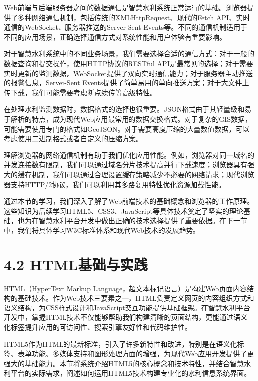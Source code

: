 Web前端与后端服务器之间的数据通信是智慧水利系统正常运行的基础。浏览器提供了多种网络通信机制，包括传统的XMLHttpRequest、现代的Fetch API、实时通信的WebSocket、服务器推送的Server-Sent Events等。不同的通信机制适用于不同的应用场景，正确选择通信方式对系统性能和用户体验有重要影响。

对于智慧水利系统中的不同业务场景，我们需要选择合适的通信方式：对于一般的数据查询和提交操作，使用HTTP协议的RESTful API是最常见的选择；对于需要实时更新的监测数据，WebSocket提供了双向实时通信能力；对于服务器主动推送的报警信息，Server-Sent Events提供了简单易用的单向推送方案；对于大文件上传下载，我们可能需要考虑断点续传等高级特性。

在处理水利监测数据时，数据格式的选择也很重要。JSON格式由于其轻量级和易于解析的特点，成为现代Web应用最常用的数据交换格式。对于复杂的GIS数据，可能需要使用专门的格式如GeoJSON。对于需要高度压缩的大量数值数据，可以考虑使用二进制格式或者自定义的压缩方案。

理解浏览器的网络通信机制有助于我们优化应用性能。例如，浏览器对同一域名的并发连接数有限制，我们可以通过域名分片技术提高并行下载速度；浏览器具有强大的缓存机制，我们可以通过合理设置缓存策略减少不必要的网络请求；现代浏览器支持HTTP/2协议，我们可以利用其多路复用特性优化资源加载性能。

通过本节的学习，我们深入了解了Web前端技术的基础概念和浏览器的工作原理。这些知识为后续学习HTML5、CSS3、JavaScript等具体技术奠定了坚实的理论基础，也为在智慧水利平台开发中做出正确的技术选择提供了重要依据。在下一节中，我们将具体学习W3C标准体系和现代Web技术的发展趋势。

\hypertarget{htmlux57faux7840ux4e0eux5b9eux8df5}{%
\section{4.2 HTML基础与实践}\label{htmlux57faux7840ux4e0eux5b9eux8df5}}

HTML（HyperText Markup Language，超文本标记语言）是构建Web页面内容结构的基础技术。作为Web技术三要素之一，HTML负责定义网页的内容组织方式和语义结构，为CSS样式设计和JavaScript交互功能提供基础框架。在智慧水利平台开发中，掌握HTML技术不仅能够帮助我们构建清晰的页面结构，更能通过语义化标签提升应用的可访问性、搜索引擎友好性和代码维护性。

HTML5作为HTML的最新标准，引入了许多新特性和改进，特别是在语义化标签、表单功能、多媒体支持和图形处理方面的增强，为现代Web应用开发提供了更强大的基础能力。本节将系统介绍HTML5的核心概念和技术特性，并结合智慧水利平台的实际需求，阐述如何运用HTML5技术构建专业化的水利信息系统界面。

